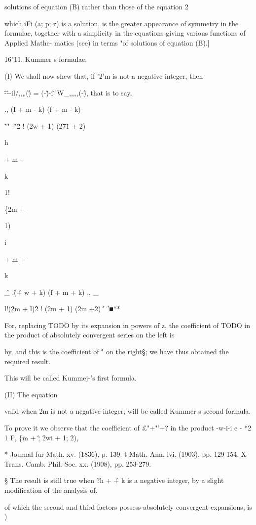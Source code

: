 solutions of equation (B) rather than those of the equation 2

which iFi (a; p; z) is a solution, is the greater appearance of
symmetry in the formulae, together with a simplicity in the equations
giving various functions of Applied Mathe- matics (see) in
terms "of solutions of equation (B).]

16"11. Kummer s formulae.

(I) We shall now shew that, if '2'm is not a negative integer, then

\^-\^--il/,,„(\^) = (-\^)-i\~''W\_,,„,(-\^), that is to say,

., (I + m - k) (f + m - k)

\^ "" -\^"\^ 2 ! (2w + 1) (27\^1 + 2)

h

+ m -

k

1!

\{2m +

1)

i

+ m +

k

\^ \_ .\^ (\^ + w + k) (f + m + k) ., \_

l!(2m + l)\^ 2 ! (2m + 1) (2m +2) \^' '■**

For, replacing TODO by its expansion in powers of z, the coefficient
of TODO in the product of absolutely convergent series on the left is

by, and this is the coefficient of \^" on the right§; we have
thus obtained the required result.

This will be called Kummej-'s first formula.

(II) The equation

valid when 2m is not a negative integer, will be called Kummer s
second formula.

To prove it we observe that the coefficient of £"+"'+? in the product
-w-i-i e - *2 1 F, \{m + \^; 2wi + 1; 2),

* Journal fur Math. xv. (1836), p. 139. t Math. Ann. lvi. (1903), pp.
129-154. X Trans. Camb. Phil. Soc. xx. (1908), pp. 253-279.

§ The result is still true when ?h + \^ + k is a negative integer, by
a slight modification of the analysis of.

%
%

of which the second and third factors possess absolutely convergent
expansions, is )

